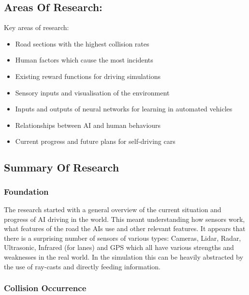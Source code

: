 \documentclass{article}
\begin{document}
\subsection{Areas Of Research:}
Key areas of research:
\begin{itemize}
    \item Road sections with the highest collision rates \cite{accident-types-and-causes}
    \item Human factors which cause the most incidents \cite{accident-types-and-causes} \cite{gov-crash-stats} \cite{Crash-human-causes}
    \item Existing reward functions for driving simulations \cite{Predictive-reward-function-for-ai-driving} \cite{Racing-reward-functions} \cite{Deep-RL-for-racing-driving} 
    \item Sensory inputs and visualisation of the environment \cite{General-overview-of-ai-driving}
    \item Inputs and outputs of neural networks for learning in automated vehicles \cite{Collision-avoidance-in-lane-free-traffic-neural-system} \cite{Deep-RL-for-AI-driving-general-overview}
    \item Relationships between AI and human behaviours \cite{Collision-frequency-ai-and-humans} 
    \item Current progress and future plans for self-driving cars \cite{Deep-learning-for-AI-driving}
\end{itemize}

\subsection{Summary Of Research}
\subsubsection{Foundation}
The research started with a general overview of the current situation and progress of AI driving in the world. This meant understanding how sensors work, what features of the road the AIs use and other relevant features. It appears that there is a surprising number of sensors of various types: Cameras, Lidar, Radar, Ultrasonic, Infrared (for lanes) and GPS \cite{General-overview-of-ai-driving} which all have various strengths and weaknesses in the real world. In the simulation this can be heavily abstracted by the use of ray-casts and directly feeding information.

\subsubsection{Collision Occurrence}
\lipsum[2][1]
\end{document}
